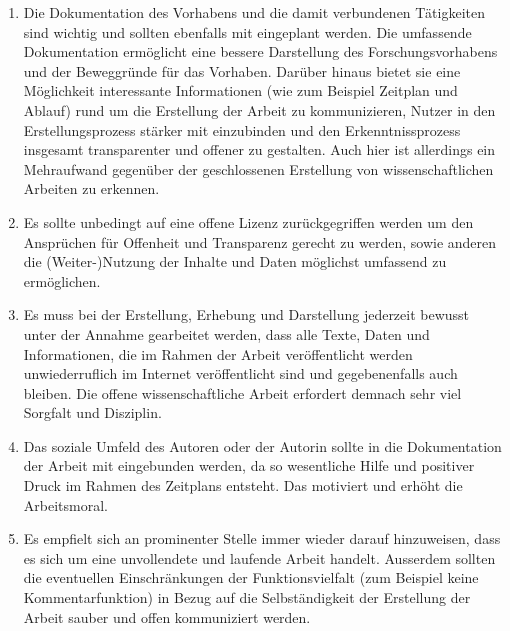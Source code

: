 \begin{enumerate}
\item Die Dokumentation des Vorhabens und die damit verbundenen Tätigkeiten sind wichtig und  sollten ebenfalls mit eingeplant werden. Die umfassende Dokumentation ermöglicht eine bessere Darstellung des Forschungsvorhabens und der Beweggründe für das Vorhaben. Darüber hinaus bietet sie eine Möglichkeit interessante Informationen (wie zum Beispiel Zeitplan und Ablauf) rund um die Erstellung der Arbeit zu kommunizieren, Nutzer in den Erstellungsprozess stärker mit einzubinden und den Erkenntnissprozess insgesamt transparenter und offener zu gestalten. Auch hier ist allerdings ein Mehraufwand gegenüber der geschlossenen Erstellung von wissenschaftlichen Arbeiten zu erkennen.
\item Es sollte unbedingt auf eine offene Lizenz zurückgegriffen werden um den Ansprüchen für Offenheit und Transparenz gerecht zu werden, sowie anderen die (Weiter-)Nutzung der Inhalte und Daten möglichst umfassend zu ermöglichen.
\item Es muss bei der Erstellung, Erhebung und Darstellung jederzeit bewusst unter der Annahme gearbeitet werden, dass alle Texte, Daten und Informationen, die im Rahmen der Arbeit veröffentlicht werden unwiederruflich im Internet veröffentlicht sind und gegebenenfalls auch bleiben. Die offene wissenschaftliche Arbeit erfordert demnach sehr viel Sorgfalt und Disziplin.
\item Das soziale Umfeld des Autoren oder der Autorin sollte in die Dokumentation der Arbeit mit eingebunden werden, da so wesentliche Hilfe und positiver Druck im Rahmen des Zeitplans entsteht. Das motiviert und erhöht die Arbeitsmoral.
\item Es empfielt sich an prominenter Stelle immer wieder darauf hinzuweisen, dass es sich um eine unvollendete und laufende Arbeit handelt. Ausserdem sollten die eventuellen Einschränkungen der Funktionsvielfalt (zum Beispiel keine Kommentarfunktion) in Bezug auf die Selbständigkeit der Erstellung der Arbeit sauber und offen kommuniziert werden.
\end{enumerate}
